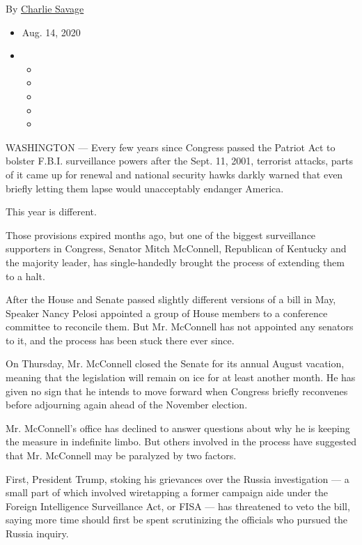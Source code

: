 By \href{https://www.nytimes3xbfgragh.onion/by/charlie-savage}{Charlie
Savage}

\begin{itemize}
\item
  Aug. 14, 2020
\item
  \begin{itemize}
  \item
  \item
  \item
  \item
  \item
  \end{itemize}
\end{itemize}

WASHINGTON --- Every few years since Congress passed the Patriot Act to
bolster F.B.I. surveillance powers after the Sept. 11, 2001, terrorist
attacks, parts of it came up for renewal and national security hawks
darkly warned that even briefly letting them lapse would unacceptably
endanger America.

This year is different.

Those provisions expired months ago, but one of the biggest surveillance
supporters in Congress, Senator Mitch McConnell, Republican of Kentucky
and the majority leader, has single-handedly brought the process of
extending them to a halt.

After the House and Senate passed slightly different versions of a bill
in May, Speaker Nancy Pelosi appointed a group of House members to a
conference committee to reconcile them. But Mr. McConnell has not
appointed any senators to it, and the process has been stuck there ever
since.

On Thursday, Mr. McConnell closed the Senate for its annual August
vacation, meaning that the legislation will remain on ice for at least
another month. He has given no sign that he intends to move forward when
Congress briefly reconvenes before adjourning again ahead of the
November election.

Mr. McConnell's office has declined to answer questions about why he is
keeping the measure in indefinite limbo. But others involved in the
process have suggested that Mr. McConnell may be paralyzed by two
factors.

First, President Trump, stoking his grievances over the Russia
investigation --- a small part of which involved wiretapping a former
campaign aide under the Foreign Intelligence Surveillance Act, or FISA
--- has threatened to veto the bill, saying more time should first be
spent scrutinizing the officials who pursued the Russia inquiry.

